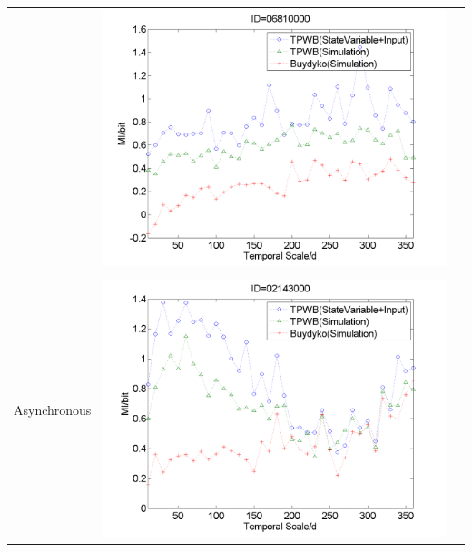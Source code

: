\documentclass[draft,wrr]{AGUTeX}
\begin{document}
\begin{article}
\begin{table}[H]
{\begin{tabular}{ccc}
&\begin{minipage}{.6\textwidth}\includegraphics[width=\linewidth]{resultgraph/06810000MI.png}\end{minipage}
\\
\\
Asynchronous
&\begin{minipage}{.6\textwidth}\includegraphics[width=\linewidth]{resultgraph/02143000MI.png}\end{minipage}
 

\end{tabular}}
\end{table}
\end{article}
\end{document}
